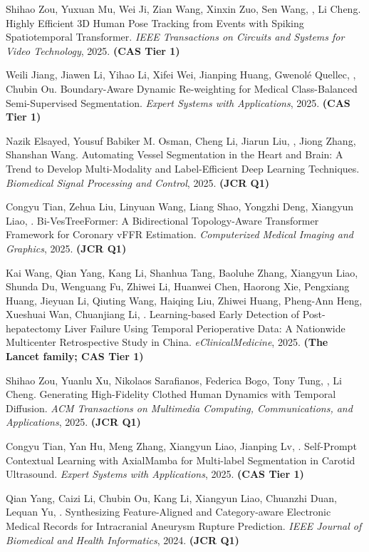 \documentclass[a4paper,12pt,english]{curve}
\begin{document}
\begin{small}
\begin{publist}
\item Shihao Zou, Yuxuan Mu, Wei Ji, Zian Wang, Xinxin Zuo, Sen Wang, \WS\CORR, Li Cheng. Highly Efficient 3D Human Pose Tracking from Events with Spiking Spatiotemporal Transformer. \emph{IEEE Transactions on Circuits and Systems for Video Technology}, 2025. \textbf{(CAS Tier 1)}
\item Weili Jiang, Jiawen Li, Yihao Li, Xifei Wei, Jianping Huang, Gwenol\'e Quellec, \WS\CORR, Chubin Ou\CORR. Boundary-Aware Dynamic Re-weighting for Medical Class-Balanced Semi-Supervised Segmentation. \emph{Expert Systems with Applications}, 2025. \textbf{(CAS Tier 1)}
\item Nazik Elsayed, Yousuf Babiker M. Osman, Cheng Li, Jiarun Liu, \WS, Jiong Zhang, Shanshan Wang\CORR. Automating Vessel Segmentation in the Heart and Brain: A Trend to Develop Multi-Modality and Label-Efficient Deep Learning Techniques. \emph{Biomedical Signal Processing and Control}, 2025. \textbf{(JCR Q1)}
\item Congyu Tian, Zehua Liu, Linyuan Wang, Liang Shao, Yongzhi Deng, Xiangyun Liao, \WS\CORR. Bi-VesTreeFormer: A Bidirectional Topology-Aware Transformer Framework for Coronary vFFR Estimation. \emph{Computerized Medical Imaging and Graphics}, 2025. \textbf{(JCR Q1)}
\item Kai Wang, Qian Yang, Kang Li, Shanhua Tang, Baoluhe Zhang, Xiangyun Liao, Shunda Du, Wenguang Fu, Zhiwei Li, Huanwei Chen, Haorong Xie, Pengxiang Huang, Jieyuan Li, Qiuting Wang, Haiqing Liu, Zhiwei Huang, Pheng-Ann Heng, Xueshuai Wan, Chuanjiang Li, \WS\CORR. Learning-based Early Detection of Post-hepatectomy Liver Failure Using Temporal Perioperative Data: A Nationwide Multicenter Retrospective Study in China. \emph{eClinicalMedicine}, 2025. \textbf{(The Lancet family; CAS Tier 1)}
\item Shihao Zou, Yuanlu Xu, Nikolaos Sarafianos, Federica Bogo, Tony Tung, \WS\CORR, Li Cheng. Generating High-Fidelity Clothed Human Dynamics with Temporal Diffusion. \emph{ACM Transactions on Multimedia Computing, Communications, and Applications}, 2025. \textbf{(JCR Q1)}
\item Congyu Tian, Yan Hu, Meng Zhang, Xiangyun Liao, Jianping Lv, \WS\CORR. Self-Prompt Contextual Learning with AxialMamba for Multi-label Segmentation in Carotid Ultrasound. \emph{Expert Systems with Applications}, 2025. \textbf{(CAS Tier 1)}
\item Qian Yang, Caizi Li, Chubin Ou, Kang Li, Xiangyun Liao, Chuanzhi Duan, Lequan Yu, \WS\CORR. Synthesizing Feature-Aligned and Category-aware Electronic Medical Records for Intracranial Aneurysm Rupture Prediction. \emph{IEEE Journal of Biomedical and Health Informatics}, 2024. \textbf{(JCR Q1)}

\end{publist}
\end{small}
\end{document}
